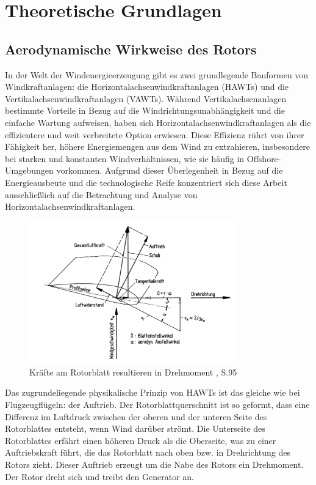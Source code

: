 \chapter{Theoretische Grundlagen}

\section{Aerodynamische Wirkweise des Rotors}
In der Welt der Windenergieerzeugung gibt es zwei grundlegende Bauformen von Windkraftanlagen: die Horizontalachsenwindkraftanlagen (HAWTs) und die Vertikalachsenwindkraftanlagen (VAWTs). Während Vertikalachsenanlagen bestimmte Vorteile in Bezug auf die Windrichtungsunabhängigkeit und die einfache Wartung aufweisen, haben sich Horizontalachsenwindkraftanlagen als die effizientere und weit verbreitete Option erwiesen. Diese Effizienz rührt von ihrer Fähigkeit her, höhere Energiemengen aus dem Wind zu extrahieren, insbesondere bei starken und konstanten Windverhältnissen, wie sie häufig in Offshore-Umgebungen vorkommen. Aufgrund dieser Überlegenheit in Bezug auf die Energieausbeute und die technologische Reife konzentriert sich diese Arbeit ausschließlich auf die Betrachtung und Analyse von Horizontalachsenwindkraftanlagen.

\begin{figure}[htbp] %
    \centering %
    \includegraphics[width=0.8\textwidth]{figures/kraft_an_blatt.png} %
    \caption{Kräfte am Rotorblatt resultieren in Drehmoment \cite{hau_physikalische_2016}, S.95} %
    \label{fig:kraft_an_blatt} %
\end{figure}

Das zugrundeliegende physikalische Prinzip von HAWTs ist das gleiche wie bei Flugzeugflügeln: der Auftrieb.
Der Rotorblattquerschnitt ist so geformt, dass eine Differenz im Luftdruck zwischen der oberen und der unteren Seite des Rotorblattes entsteht, wenn Wind darüber strömt.
Die Unterseite des Rotorblattes erfährt einen höheren Druck als die Oberseite, was zu einer Auftriebskraft führt, die das Rotorblatt nach oben bzw. in Drehrichtung des Rotors zieht.
Dieser Auftrieb erzeugt um die Nabe des Rotors ein Drehmoment. Der Rotor dreht sich und treibt den Generator an.

